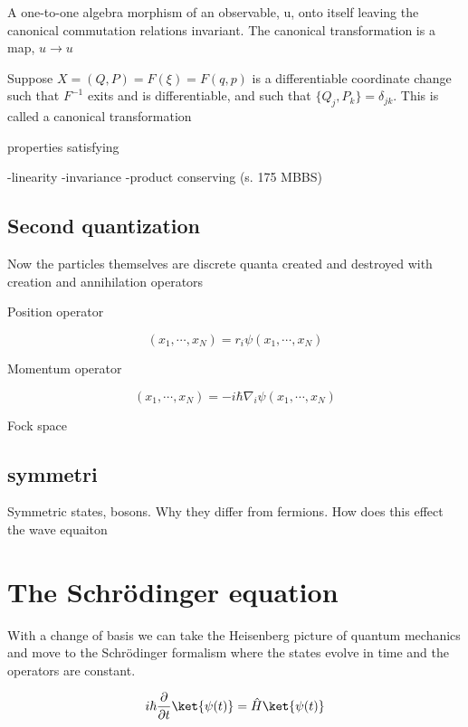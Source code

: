 A one-to-one algebra morphism of an observable, u, onto itself leaving the canonical commutation relations invariant. The canonical transformation is a map, $u \rightarrow u$ 

Suppose $X = (Q, P) = F(\xi) = F(q, p)$ is a differentiable coordinate change such that $F^{-1}$ exits and is differentiable, and such that $\{Q_j, P_k\} = \delta_{jk}$. This is called a canonical transformation

properties satisfying 

-linearity
-invariance
-product conserving (s. 175 MBBS)

\subsection{Second quantization}

Now the particles themselves are discrete quanta created and destroyed with creation and annihilation operators

Position operator 

\begin{equation}
[\hat{r_i} \psi](x_1, \cdots, x_N) = r_i \psi (x_1, \cdots, x_N) 
\end{equation}

Momentum operator 

\begin{equation}
[\hat{p_i} \psi](x_1, \cdots, x_N) = -i \hbar \nabla_i \psi (x_1, \cdots, x_N) 
\end{equation}

Fock space

\subsection{symmetri}
Symmetric states, bosons. Why they differ from fermions.
How does this effect the wave equaiton

\section{The Schrödinger equation}

With a change of basis we can take the Heisenberg picture of quantum mechanics and move to the Schrödinger formalism where the states evolve in time and the operators are constant. 

\begin{equation}
i \hbar \frac{\partial}{\partial t} \ket{\psi(t)} = \hat{H} \ket{\psi(t)}
\end{equation}

